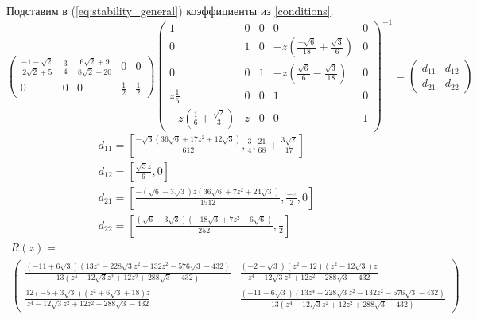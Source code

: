 \documentclass[a4paper,article,14pt]{extarticle}
\begin{document}
Подставим в (\ref{eq:stability_general}) коэффициенты из \ref{conditions}.
\begin{equation}
\begin{pmatrix}
    \frac{-1 - \sqrt{2}}{2 \sqrt{2} + 5} & \frac{3}{4} &  \frac{6 \sqrt{2} + 9}{8 \sqrt{2} + 20} & 0 & 0 \\
    0 & 0 & 0 & \frac{1}{2} & \frac{1}{2}
\end{pmatrix}
\begin{pmatrix}
    1 & 0 & 0 & 0 & 0\\
    0 & 1 & 0 & -z (\frac{-\sqrt{6}}{18} + \frac{\sqrt{3}}{6}) & 0\\
    0 & 0 & 1 & -z (\frac{\sqrt{6}}{6} - \frac{\sqrt{3}}{18}) & 0\\
    z \frac{1}{6} & 0 & 0 & 1 & 0 \\
    -z (\frac{1}{6} + \frac{\sqrt{2}}{3}) & z & 0 & 0 & 1
\end{pmatrix}^{-1}
=
 \begin{pmatrix}
    d_{11} & d_{12} \\
    d_{21} & d_{22}
\end{pmatrix}
\end{equation}
\begin{equation}
\begin{gathered}
    d_{11} = \left[
    \frac{-\sqrt{3} (36 \sqrt{6} + 17 z^{2} + 12 \sqrt{3})}{612}, \frac{3}{4}, \frac{21}{68} + \frac{3 \sqrt{2}}{17}
    \right] \\
    d_{12} = \left[
    \frac{\sqrt{3} z}{6}, 0
    \right] \\
    d_{21} = \left[
    \frac{-(\sqrt{6} - 3 \sqrt{3}) z (36 \sqrt{6} + 7 z^{2} + 24 \sqrt{3})}{1512}, \frac{-z}{2}, 0
    \right] \\
    d_{22} = \left[
    \frac{(\sqrt{6} - 3 \sqrt{3}) (-18 \sqrt{3} + 7 z^{2} - 6 \sqrt{6})}{252}, \frac{1}{2}
    \right]
\end{gathered}
\end{equation}
\begin{equation}
\begin{aligned}
    R(z) = \\
\begin{pmatrix}
    \frac{(-11 + 6 \sqrt{3}) (13 z^{4} - 228 \sqrt{3} z^{2} - 132 z^{2} - 576 \sqrt{3} - 432)}{13 (z^{4} - 12 \sqrt{3} z^{2} + 12 z^{2} + 288 \sqrt{3} - 432)} & 
    \frac{(-2 + \sqrt{3}) (z^{2} + 12) (z^{2} - 12 \sqrt{3}) z}{z^{4} - 12 \sqrt{3} z^{2} + 12 z^{2} + 288 \sqrt{3} - 432}\\
    \frac{12 (-5 + 3 \sqrt{3}) (z^{2} + 6 \sqrt{3} + 18) z}{z^{4} - 12 \sqrt{3} z^{2} + 12 z^{2} + 288 \sqrt{3} - 432} &
    \frac{(-11 + 6 \sqrt{3}) (13 z^{4} - 228 \sqrt{3} z^{2} - 132 z^{2} - 576 \sqrt{3} - 432)}{13 (z^{4} - 12 \sqrt{3} z^{2} + 12 z^{2} + 288 \sqrt{3} - 432)}
\end{pmatrix}
\end{aligned}
    \label{eq:stability_function}
\end{equation}
\end{document}

